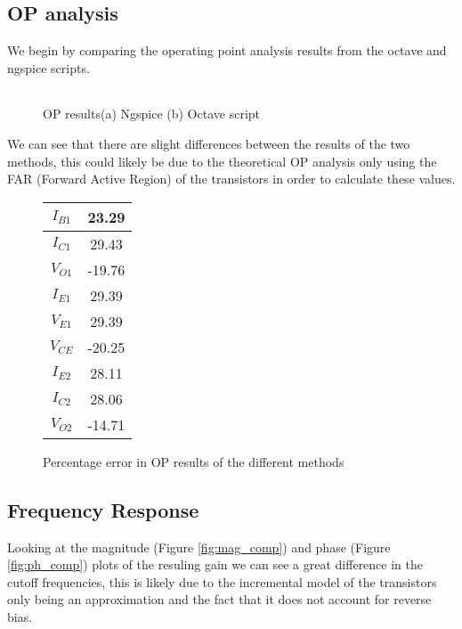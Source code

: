 \subsection{OP analysis}
\hspace{12pt} We begin by comparing the operating point analysis results from the octave and ngspice scripts.


\begin{figure}[h]
	\centering
	\begin{minipage}[t]{.4\textwidth}
		\centering
		\large
		\begin{tabular}{|c|c|}
		\hline
		
		\end{tabular}
		\normalsize
	\end{minipage}
	\medskip
	\begin{minipage}{.4\textwidth}
		\centering
		
		\Large
       	
       	\normalsize
	\end{minipage}
	 \label{fig:op_comp}
	 \caption{OP results(a) Ngspice (b) Octave script}
\end{figure}

We can see that there are slight differences between the results of the two methods, this could likely be due to the theoretical OP analysis only using the FAR (Forward Active Region) of the transistors in order to calculate these values.

\begin{figure}[h]
	\centering
	\begin{tabular}{|c|c|}
		\hline
		$I_{B1}$ & 23.29 \\ \hline
		$I_{C1}$ & 29.43 \\ \hline
		$V_{O1}$ & -19.76 \\ \hline
		$I_{E1}$ & 29.39 \\ \hline
		$V_{E1}$ & 29.39 \\ \hline
		$V_{CE}$ & -20.25 \\ \hline
		$I_{E2}$ & 28.11 \\ \hline
		$I_{C2}$ & 28.06 \\ \hline
		$V_{O2}$ & -14.71 \\ \hline
	\end{tabular}
	\caption{Percentage error in OP results of the different methods}
	\label{fig:op_err}
\end{figure}

\subsection{Frequency Response}
\hspace{12pt} Looking at the magnitude (Figure \ref{fig:mag_comp}) and phase (Figure \ref{fig:ph_comp}) plots of the resuling gain we can see a great difference in the cutoff frequencies, this is likely due to the incremental model of the transistors only being an approximation and the fact that it does not account for reverse bias.
\pagebreak

